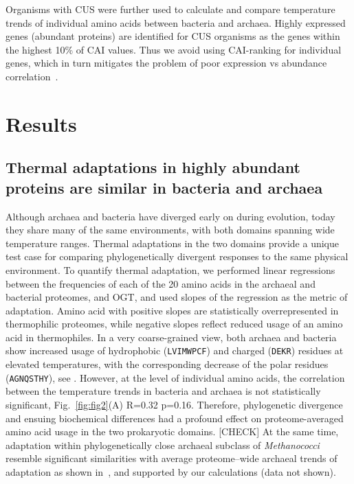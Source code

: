 \documentclass[10pt,letterpaper]{article}
\begin{document}
Organisms with CUS were further used to calculate and compare temperature trends of individual amino acids between bacteria and archaea. Highly expressed genes (abundant proteins) are identified for CUS organisms as the genes within the highest 10\% of CAI values. Thus we avoid using CAI-ranking for individual genes, which in turn mitigates the problem of poor expression vs abundance correlation~\cite{Maier2009Correlation}.


\section*{Results}

\subsection*{Thermal adaptations in highly abundant proteins are similar in bacteria and archaea}

Although archaea and bacteria have diverged early on during evolution, today they share many of the same environments, with both domains spanning wide temperature ranges. Thermal adaptations in the two domains provide a unique test case for comparing phylogenetically divergent responses to the same physical environment. To quantify thermal adaptation, we performed linear regressions between the frequencies of each of the 20 amino acids in the archaeal and bacterial proteomes, and OGT, and used slopes of the regression as the metric of adaptation. Amino acid with positive slopes are statistically overrepresented in thermophilic proteomes, while negative slopes reflect reduced usage  of an amino acid in thermophiles.
In a very coarse-grained view, both archaea and bacteria show increased usage of hydrophobic (\texttt{LVIMWPCF}) and charged (\texttt{DEKR}) residues at elevated temperatures, with the corresponding decrease of the polar residues (\texttt{AGNQSTHY}), see .
However, at the level of individual amino acids, the correlation between the temperature trends in bacteria and archaea is not statistically significant, Fig.~\ref{fig:fig2}(A) R=0.32 p=0.16.  Therefore, phylogenetic divergence and ensuing biochemical differences had a profound effect on proteome-averaged amino acid usage in the two prokaryotic domains.
[CHECK] At the same time, adaptation within phylogenetically close archaeal subclass of {\it Methanococci} resemble significant similarities with average proteome--wide archaeal trends of adaptation as shown in~\cite{Haney1999Thermal}, and supported by our calculations (data not shown).
\end{document}
